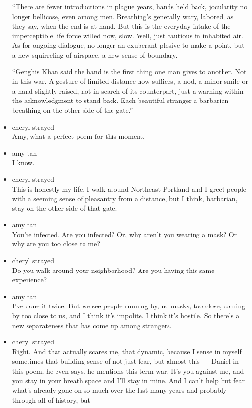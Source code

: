 \begin{itemize}
  ``There are fewer introductions in plague years, hands held back,
  jocularity no longer bellicose, even among men. Breathing's generally
  wary, labored, as they say, when the end is at hand. But this is the
  everyday intake of the imperceptible life force willed now, slow.
  Well, just cautious in inhabited air. As for ongoing dialogue, no
  longer an exuberant plosive to make a point, but a new squirreling of
  airspace, a new sense of boundary.

  ``Genghis Khan said the hand is the first thing one man gives to
  another. Not in this war. A gesture of limited distance now suffices,
  a nod, a minor smile or a hand slightly raised, not in search of its
  counterpart, just a warning within the acknowledgment to stand back.
  Each beautiful stranger a barbarian breathing on the other side of the
  gate.''
\item
  cheryl strayed\\
  Amy, what a perfect poem for this moment.
\item
  amy tan\\
  I know.
\item
  cheryl strayed\\
  This is honestly my life. I walk around Northeast Portland and I greet
  people with a seeming sense of pleasantry from a distance, but I
  think, barbarian, stay on the other side of that gate.
\item
  amy tan\\
  You're infected. Are you infected? Or, why aren't you wearing a mask?
  Or why are you too close to me?
\item
  cheryl strayed\\
  Do you walk around your neighborhood? Are you having this same
  experience?
\item
  amy tan\\
  I've done it twice. But we see people running by, no masks, too close,
  coming by too close to us, and I think it's impolite. I think it's
  hostile. So there's a new separateness that has come up among
  strangers.
\item
  cheryl strayed\\
  Right. And that actually scares me, that dynamic, because I sense in
  myself sometimes that building sense of not just fear, but almost this
  --- Daniel in this poem, he even says, he mentions this term war. It's
  you against me, and you stay in your breath space and I'll stay in
  mine. And I can't help but fear what's already gone on so much over
  the last many years and probably through all of history, but

\end{itemize}
